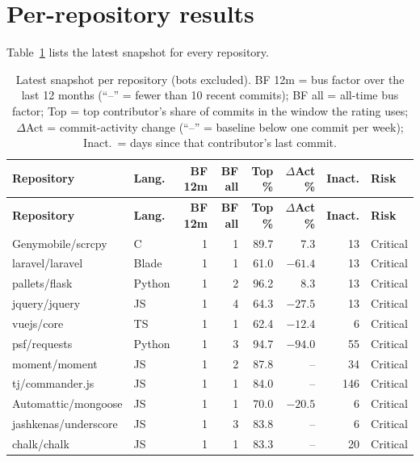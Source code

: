 \documentclass[11pt,a4paper]{report}
\newcommand{\risk}[1]{\textsf{\small #1}}
\begin{document}
\section{Per-repository results}

Table~\ref{tab:all} lists the latest snapshot for every repository.

\begin{small}
\setlength{\tabcolsep}{4pt}
\begin{longtable}{l l r r r r r l}
\caption{Latest snapshot per repository (bots excluded). BF 12m = bus factor
over the last 12 months (``--'' = fewer than 10 recent commits); BF all =
all-time bus factor; Top = top contributor's share of commits in the window
the rating uses; $\Delta$Act = commit-activity change (``--'' = baseline below
one commit per week); Inact.\ = days since that contributor's last commit.}
\label{tab:all}\\
\toprule
\textbf{Repository} & \textbf{Lang.} & \textbf{BF 12m} & \textbf{BF all} & \textbf{Top \%} & \textbf{$\Delta$Act \%} & \textbf{Inact.} & \textbf{Risk} \\
\midrule
\endfirsthead
\toprule
\textbf{Repository} & \textbf{Lang.} & \textbf{BF 12m} & \textbf{BF all} & \textbf{Top \%} & \textbf{$\Delta$Act \%} & \textbf{Inact.} & \textbf{Risk} \\
\midrule
\endhead
\bottomrule
\endfoot
Genymobile/scrcpy & C & 1 & 1 & 89.7 & 7.3 & 13 & \risk{Critical} \\
laravel/laravel & Blade & 1 & 1 & 61.0 & $-61.4$ & 13 & \risk{Critical} \\
pallets/flask & Python & 1 & 2 & 96.2 & 8.3 & 13 & \risk{Critical} \\
jquery/jquery & JS & 1 & 4 & 64.3 & $-27.5$ & 13 & \risk{Critical} \\
vuejs/core & TS & 1 & 1 & 62.4 & $-12.4$ & 6 & \risk{Critical} \\
psf/requests & Python & 1 & 3 & 94.7 & $-94.0$ & 55 & \risk{Critical} \\
moment/moment & JS & 1 & 2 & 87.8 & -- & 34 & \risk{Critical} \\
tj/commander.js & JS & 1 & 1 & 84.0 & -- & 146 & \risk{Critical} \\
Automattic/mongoose & JS & 1 & 1 & 70.0 & $-20.5$ & 6 & \risk{Critical} \\
jashkenas/underscore & JS & 1 & 3 & 83.8 & -- & 6 & \risk{Critical} \\
chalk/chalk & JS & 1 & 1 & 83.3 & -- & 20 & \risk{Critical} \\

\end{longtable}
\end{small}
\end{document}
